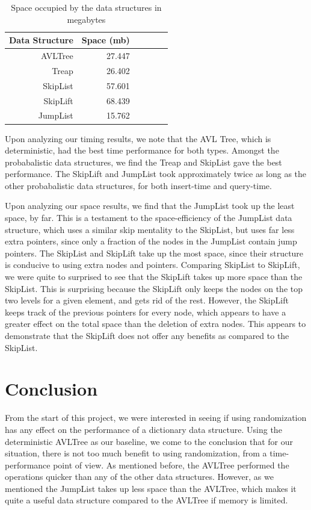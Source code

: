 \documentclass[oribibl]{llncs}
\begin{document}
\begin{table}[htbp]
\caption{Space occupied by the data structures in megabytes}
\begin{center}
\begin{tabular}{|r|r|r|r|r|r|}
\hline
Data Structure & Space (mb) \\ \hline
AVLTree & 27.447 \\ \hline
Treap & 26.402 \\ \hline
SkipList & 57.601  \\ \hline
SkipLift & 68.439 \\ \hline
JumpList & 15.762 \\ \hline
\end{tabular}
\end{center}
\label{abc}
\end{table}

Upon analyzing our timing results, we note that the AVL Tree, which is deterministic, had the best time performance for both types. Amongst the probabalistic data structures, we find the Treap and SkipList gave the best performance. The SkipLift and JumpList took approximately twice as long as the other probabalistic data structures, for both insert-time and query-time.

Upon analyzing our space results, we find that the JumpList took up the least space, by far. This is a testament to the space-efficiency of the JumpList data structure, which uses a similar skip mentality to the SkipList, but uses far less extra pointers, since only a fraction of the nodes in the JumpList contain jump pointers. The SkipList and SkipLift take up the most space, since their structure is conducive to using extra nodes and pointers. Comparing SkipList to SkipLift, we were quite to surprised to see that the SkipLift takes up more space than the SkipList. This is surprising because the SkipLift only keeps the nodes on the top two levels for a given element, and gets rid of the rest. However, the SkipLift keeps track of the previous pointers for every node, which appears to have a greater effect on the total space than the deletion of extra nodes. This appears to demonstrate that the SkipLift does not offer any benefits as compared to the SkipList.

\section{Conclusion}
\label{sctn:Conclusion}

From the start of this project, we were interested in seeing if using randomization has any effect on the performance of a dictionary data structure. Using the deterministic AVLTree as our baseline, we come to the conclusion that for our situation, there is not too much benefit to using randomization, from a time-performance point of view. As mentioned before, the AVLTree performed the operations quicker than any of the other data structures. However, as we mentioned the JumpList takes up less space than the AVLTree, which makes it quite a useful data structure compared to the AVLTree if memory is limited.
\end{document}
